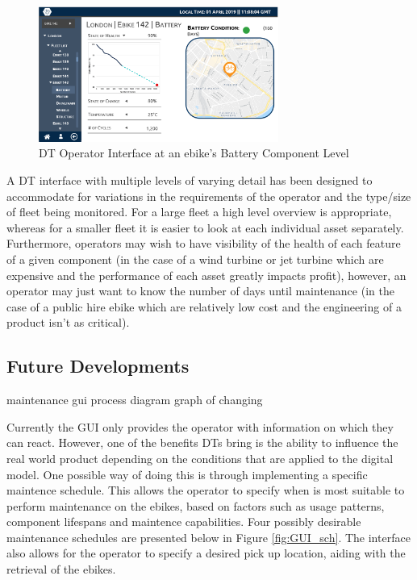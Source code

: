 \documentclass[a4paper, 10pt]{article}
\numberwithin{equation}{section}
\begin{document}
\begin{figure}[H]
\centering
\includegraphics[width=0.7\textwidth]{images/screen4.png}
\caption{DT Operator Interface at an ebike's Battery Component Level}
\label{fig:GUI_4}
\end{figure}

A DT interface with multiple levels of varying detail has been designed to accommodate for variations in the requirements of the operator and the type/size of fleet being monitored. For a large fleet a high level overview is appropriate, whereas for a smaller fleet it is easier to look at each individual asset separately. Furthermore, operators may wish to have visibility of the health of each feature of a given component (in the case of a wind turbine or jet turbine which are expensive and the performance of each asset greatly impacts profit), however, an operator may just want to know the number of days until maintenance (in the case of a public hire ebike which are relatively low cost and the engineering of a product isn't as critical).

\subsection{Future Developments}



maintenance gui
process diagram
graph of changing

Currently the  GUI only provides the operator with information on which they can react. However, one of the benefits DTs bring is the ability to influence the real world product depending on the conditions that are applied to the digital model. One possible way of doing this is through implementing a specific maintence schedule. This allows the operator to specify when is most suitable to perform maintenance on the ebikes, based on factors such as usage patterns, component lifespans and maintence capabilities. Four possibly desirable maintenance schedules are presented below in Figure \ref{fig:GUI_sch}. The interface also allows for the operator to specify a desired pick up location, aiding with the retrieval of the ebikes.
\end{document}
